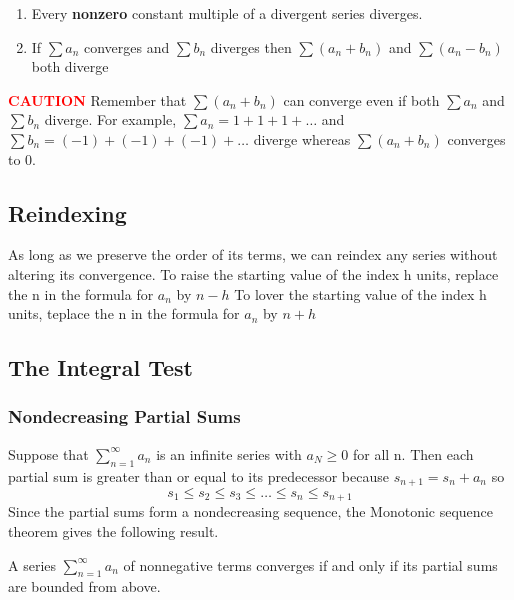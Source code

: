\documentclass[12pt,a4paper]{article}
\newenvironment{corollary}{\begin{corollarybox}}{\end{corollarybox}\vspace{1\baselineskip}}
\newcommand{\infsum}{\sum_{n=1}^{\infty}}
\begin{document}
\begin{note}
    \begin{enumerate}
        \item Every \textbf{nonzero} constant multiple of a divergent series diverges.
        \item If \(\sum a_n\) converges and \(\sum b_n\) diverges then \(\sum (a_n + b_n) \) and \(\sum (a_n - b_n) \) both diverge    
    \end{enumerate}
\end{note}

\textcolor{red}{\textbf{CAUTION}} Remember that \(\sum (a_n + b_n) \) can converge even if both \(\sum a_n\) and \(\sum b_n\) diverge. For example, \(\sum a_n = 1 + 1 + 1 + \dots \) and \(\sum b_n = (-1) + (-1) + (-1) + \dots\) diverge whereas \(\sum (a_n + b_n) \) converges to 0.

\subsection*{Reindexing}
As long as we preserve the order of its terms, we can reindex any series without altering its convergence. To raise the starting value of the index h units, replace the n in the formula for \(a_n\) by  \(n-h\)
To lover the starting value of the index h units, teplace the n in the formula for \(a_n\) by \(n+h\)


\subsection{The Integral Test}

\subsubsection*{Nondecreasing Partial Sums}

Suppose that \(\infsum a_n\) is an infinite series with \(a_N \geq 0\) for all n. Then each partial sum is greater than or equal to its predecessor because \(s_{n+1} = s_n + a_n\) so
\[s_1 \leq s_2 \leq s_3 \leq \dots \leq s_n \leq s_{n+1}\]
Since the partial sums form a nondecreasing sequence, the Monotonic sequence theorem gives the following result.

\begin{corollary}
    A series \( \infsum a_n \) of nonnegative terms converges if and only if its partial sums are bounded from above.
\end{corollary}

\newpage
\end{document}
